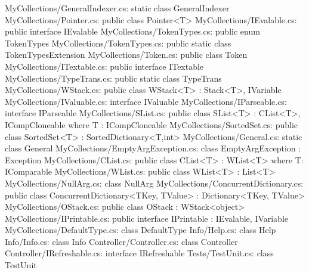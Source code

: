 MyCollections/GeneralIndexer.cs:	static class GeneralIndexer 
MyCollections/Pointer.cs:	public class Pointer<T> 
MyCollections/IEvalable.cs:	public interface IEvalable 
MyCollections/TokenTypes.cs:	public enum TokenTypes 
MyCollections/TokenTypes.cs:	public static class TokenTypesExtension 
MyCollections/Token.cs:	public class Token 
MyCollections/ITextable.cs:	public interface ITextable 
MyCollections/TypeTrans.cs:	public static class TypeTrans 
MyCollections/WStack.cs:	public class WStack<T> : Stack<T>, IVariable 
MyCollections/IValuable.cs:	interface IValuable 
MyCollections/IParseable.cs:	interface IParseable 
MyCollections/SList.cs:	public class SList<T> : CList<T>, ICompCloneable where T : ICompCloneable 
MyCollections/SortedSet.cs:	public class SortedSet<T> : SortedDictionary<T,int> 
MyCollections/General.cs:	static class General 
MyCollections/EmptyArgException.cs:	class EmptyArgException : Exception 
MyCollections/CList.cs:	public class CList<T> : WList<T> where T: IComparable 
MyCollections/WList.cs:	public class WList<T> : List<T> 
MyCollections/NullArg.cs:	class NullArg 
MyCollections/ConcurrentDictionary.cs:	public class ConcurrentDictionary<TKey, TValue> : Dictionary<TKey, TValue> 
MyCollections/OStack.cs:	public class OStack : WStack<object> 
MyCollections/IPrintable.cs:	public interface IPrintable : IEvalable, IVariable 
MyCollections/DefaultType.cs:	class DefaultType 
Info/Help.cs:	class Help 
Info/Info.cs:	class Info 
Controller/Controller.cs:	class Controller 
Controller/IRefreshable.cs:	interface IRefreshable 
Tests/TestUnit.cs:	class TestUnit 
